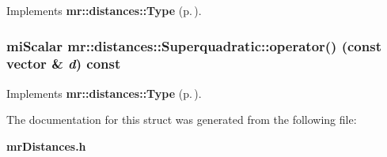 Implements {\bf mr::distances::Type} {\rm (p.\,\pageref{structmr_1_1distances_1_1Type_a1})}.
\subsubsection{\setlength{\rightskip}{0pt plus 5cm}mi\-Scalar mr::distances::Superquadratic::operator() (const {\bf vector} \& {\em d}) const\hspace{0.3cm}{\tt  [inline, virtual]}}\label{structmr_1_1distances_1_1Superquadratic_a0}




Implements {\bf mr::distances::Type} {\rm (p.\,\pageref{structmr_1_1distances_1_1Type_a0})}.

The documentation for this struct was generated from the following file:\begin{CompactItemize}
\item 
{\bf mr\-Distances.h}\end{CompactItemize}
